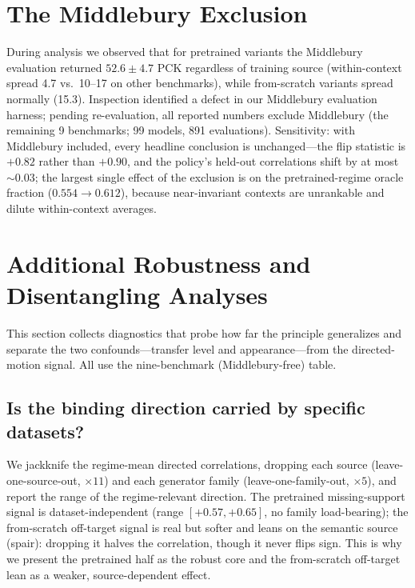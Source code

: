 \documentclass[runningheads]{llncs}
\newcommand{\pck}{PCK}
\begin{document}
\section{The Middlebury Exclusion}
\label{supp:mid}

During analysis we observed that for pretrained variants the Middlebury
evaluation returned $52.6 \pm 4.7$ \pck{} regardless of training source
(within-context spread 4.7 vs.\ 10--17 on other benchmarks), while
from-scratch variants spread normally (15.3). Inspection identified a defect
in our Middlebury evaluation harness; pending re-evaluation, all reported
numbers exclude Middlebury (the remaining 9 benchmarks; 99 models, 891
evaluations). Sensitivity: with Middlebury included, every headline conclusion
is unchanged---the flip statistic is $+0.82$ rather than $+0.90$, and the
policy's held-out correlations shift by at most ${\sim}0.03$; the largest
single effect of the exclusion is on the pretrained-regime oracle fraction
($0.554\!\to\!0.612$), because
near-invariant contexts are unrankable and dilute within-context averages.

\section{Additional Robustness and Disentangling Analyses}
\label{supp:newrobust}
This section collects diagnostics that probe how far the principle generalizes
and separate the two confounds---transfer level and appearance---from the
directed-motion signal. All use the nine-benchmark (Middlebury-free) table.

\subsection{Is the binding direction carried by specific datasets?}
We jackknife the regime-mean directed correlations, dropping each source
(leave-one-source-out, $\times 11$) and each generator family
(leave-one-family-out, $\times 5$), and report the range of the
regime-relevant direction. The pretrained missing-support signal is
dataset-independent (range $[{+}0.57,{+}0.65]$, no family load-bearing); the
from-scratch off-target signal is real but softer and leans on the semantic
source (spair): dropping it halves the correlation, though it never flips sign.
This is why we present the pretrained half as the robust core and the
from-scratch off-target lean as a weaker, source-dependent effect.
\begin{table}[h]\centering\small
\resizebox{\linewidth}{!}{}
\caption{Per-regime source/family jackknife. ``Span'' is the spread of the
regime-relevant correlation over all 16 single drops.}
\label{tab:new_jackknife}
\end{table}
\end{document}

